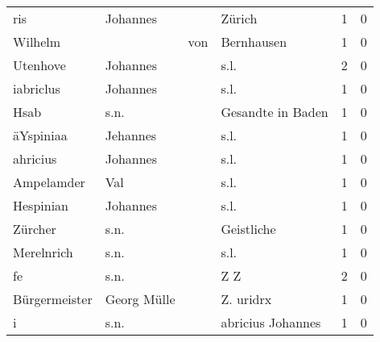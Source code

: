 \documentclass[10pt,a4paper,landscape]{article}
\begin{document}
\begin{longtable}{llllrr}
                      ris &                           Johannes &             &                                      Zürich &          1 &         0 \\
                  Wilhelm &                                    &         von &                                  Bernhausen &          1 &         0 \\
                 Utenhove &                           Johannes &             &                                        s.l. &          2 &         0 \\
                iabriclus &                           Johannes &             &                                        s.l. &          1 &         0 \\
                     Hsab &                               s.n. &             &                           Gesandte in Baden &          1 &         0 \\
                äYspiniaa &                           Jehannes &             &                                        s.l. &          1 &         0 \\
                 ahricius &                           Johannes &             &                                        s.l. &          1 &         0 \\
               Ampelamder &                                Val &             &                                        s.l. &          1 &         0 \\
                Hespinian &                           Johannes &             &                                        s.l. &          1 &         0 \\
                  Zürcher &                               s.n. &             &                                  Geistliche &          1 &         0 \\
               Merelnrich &                               s.n. &             &                                        s.l. &          1 &         0 \\
                       fe &                               s.n. &             &                                         Z Z &          2 &         0 \\
            Bürgermeister &                        Georg Mülle &             &                                   Z. uridrx &          1 &         0 \\
                        i &                               s.n. &             &                           abricius Johannes &          1 &         0 \\

\end{longtable}
\end{document}

